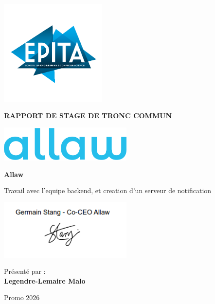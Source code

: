 \begin{titlepage}
\begin{center}
\includegraphics[width=0.4\textwidth]{media/image1.png}

\vspace{1cm}
{\huge\bfseries RAPPORT DE STAGE DE TRONC COMMUN\par}
\vspace{1cm}

\includegraphics[width=0.5\textwidth]{media/allaw.png}

\vspace{1.5cm}
{\Large\bfseries Allaw\par}
\vspace{0.5cm}
{\large Travail avec l'equipe backend, et creation d'un serveur de notification\par}

\includegraphics[width=0.5\textwidth]{media/signature.png}

\vfill  %

{\large Présenté par :\\
\textbf{Legendre-Lemaire Malo}\par}  %

\vspace{0.5cm}
{\large Promo 2026\par}  %
\end{center}
\end{titlepage}
